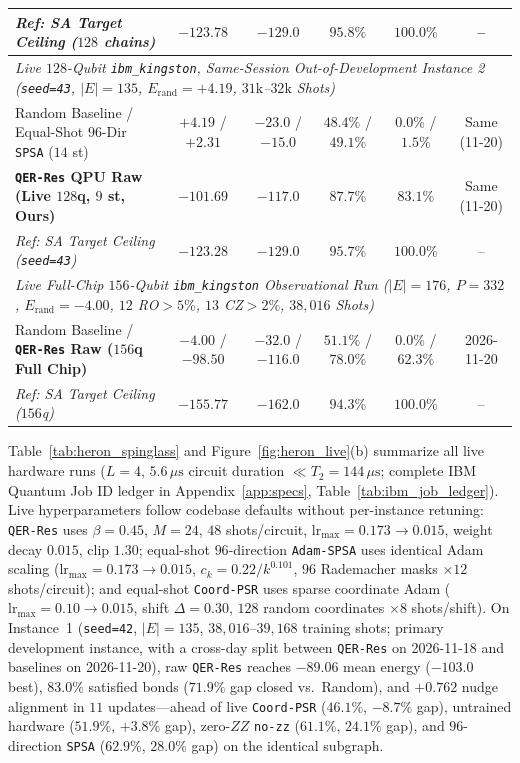 \documentclass[11pt]{article}
\begin{document}
\begin{table}[t!]
{\begin{tabular}{@{}lccccc@{}}
\textit{Ref: SA Target Ceiling ($128$ chains)} & $-123.78$ & $-129.0$ & $95.8\%$ & $100.0\%$ & -- \\
\midrule
\multicolumn{6}{l}{\textit{Live $128$-Qubit \texttt{ibm\_kingston}, Same-Session Out-of-Development Instance 2 (\texttt{seed=43}, $|E|{=}135$, $E_{\text{rand}}{=}+4.19$, $31\text{k}$--$32\text{k}$ Shots)}} \\
\midrule
Random Baseline / Equal-Shot $96$-Dir \texttt{SPSA} ($14$ st) & $+4.19$ / $+2.31$ & $-23.0$ / $-15.0$ & $48.4\%$ / $49.1\%$ & $0.0\%$ / $1.5\%$ & Same (11-20) \\
\textbf{\texttt{QER-Res} QPU Raw (Live $128$q, $9$ st, Ours)} & $\mathbf{-101.69}$ & $\mathbf{-117.0}$ & $\mathbf{87.7\%}$ & $\mathbf{83.1\%}$ & Same (11-20) \\
\textit{Ref: SA Target Ceiling (\texttt{seed=43})} & $-123.28$ & $-129.0$ & $95.7\%$ & $100.0\%$ & -- \\
\midrule
\multicolumn{6}{l}{\textit{Live Full-Chip $156$-Qubit \texttt{ibm\_kingston} Observational Run ($|E|{=}176$, $P{=}332$, $E_{\text{rand}}{=}-4.00$, $12$ RO$>5\%$, $13$ CZ$>2\%$, $38{,}016$ Shots)}} \\
\midrule
Random Baseline / \textbf{\texttt{QER-Res} Raw ($156$q Full Chip)} & $-4.00$ / $\mathbf{-98.50}$ & $-32.0$ / $\mathbf{-116.0}$ & $51.1\%$ / $\mathbf{78.0\%}$ & $0.0\%$ / $\mathbf{62.3\%}$ & 2026-11-20 \\
\textit{Ref: SA Target Ceiling ($156$q)} & $-155.77$ & $-162.0$ & $94.3\%$ & $100.0\%$ & -- \\
\bottomrule
\end{tabular}%
}
\end{table}

Table~\ref{tab:heron_spinglass} and Figure~\ref{fig:heron_live}(b) summarize all live hardware runs ($L{=}4$, $5.6\,\mu\text{s}$ circuit duration $\ll T_2{=}144\,\mu\text{s}$; complete IBM Quantum Job ID ledger in Appendix~\ref{app:specs}, Table~\ref{tab:ibm_job_ledger}). Live hyperparameters follow codebase defaults without per-instance retuning: \texttt{QER-Res} uses $\beta{=}0.45$, $M{=}24$, $48$ shots/circuit, $\text{lr}_{\max}{=}0.173{\to}0.015$, weight decay $0.015$, clip $1.30$; equal-shot $96$-direction \texttt{Adam-SPSA} uses identical Adam scaling ($\text{lr}_{\max}{=}0.173{\to}0.015$, $c_k{=}0.22/k^{0.101}$, $96$ Rademacher masks $\times 12$ shots/circuit); and equal-shot \texttt{Coord-PSR} uses sparse coordinate Adam ($\text{lr}_{\max}{=}0.10{\to}0.015$, shift $\Delta{=}0.30$, $128$ random coordinates $\times 8$ shots/shift). On Instance~1 (\texttt{seed=42}, $|E|{=}135$, $38{,}016$--$39{,}168$ training shots; primary development instance, with a cross-day split between \texttt{QER-Res} on 2026-11-18 and baselines on 2026-11-20), raw \texttt{QER-Res} reaches $-89.06$ mean energy ($-103.0$ best), $83.0\%$ satisfied bonds ($71.9\%$ gap closed vs.\ Random), and $+0.762$ nudge alignment in $11$ updates—ahead of live \texttt{Coord-PSR} ($46.1\%$, $-8.7\%$ gap), untrained hardware ($51.9\%$, $+3.8\%$ gap), zero-$ZZ$ \texttt{no-zz} ($61.1\%$, $24.1\%$ gap), and $96$-direction \texttt{SPSA} ($62.9\%$, $28.0\%$ gap) on the identical subgraph.
\end{document}
